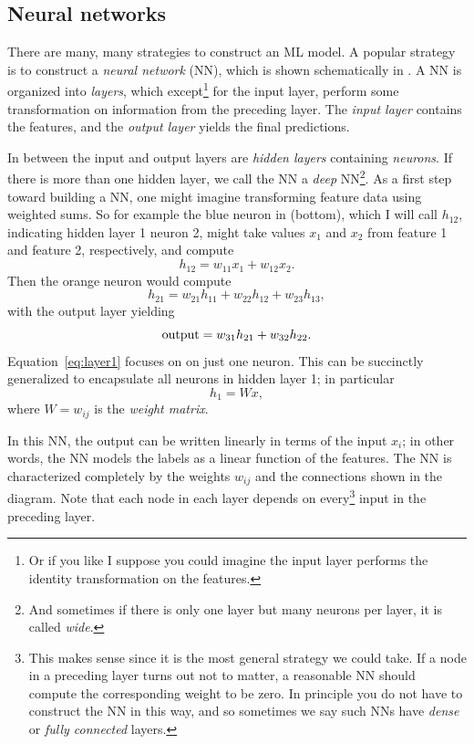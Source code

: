 \subsection{Neural networks}\label{sec:NN}

There are many, many strategies to construct an ML model.
A popular strategy is to construct a {\it neural network}
(NN), which is shown schematically in . 
A NN is organized into {\it layers}, which except\footnote{Or if you like
I suppose you could imagine the input layer performs the identity
transformation on the features.} for the input layer,
perform some transformation on information from the preceding layer. 
The {\it input layer} contains the features, and
the {\it output layer} yields the final predictions.

In between the input and output layers are 
{\it hidden layers} containing {\it neurons}.
If there is more than one hidden layer, we call the NN a {\it deep}
NN\footnote{And sometimes if there is only one
layer but many neurons per layer, it is called {\it wide}.}.
As a first step toward building a NN, one might imagine transforming
feature data using weighted sums. So for example 
the blue neuron in  (bottom), which I will
call $h_{12}$, indicating hidden layer 1 neuron 2, might take values
$x_1$ and $x_2$ from feature 1 and feature 2, respectively, and compute
\begin{equation}\label{eq:layer1}
h_{12} = w_{11}x_1+w_{12}x_2.
\end{equation}
Then the orange neuron would compute
\begin{equation}
h_{21} = w_{21}h_{11}+w_{22}h_{12}+w_{23}h_{13},
\end{equation}
with the output layer yielding
\begin{equation}
{\rm output} = w_{31}h_{21}+w_{32}h_{22}.
\end{equation}
Equation~\eqref{eq:layer1} focuses on on just one neuron. This can be succinctly
generalized to encapsulate all neurons in hidden layer 1; in particular
\begin{equation}
h_1=W x,
\end{equation} 
where $W=w_{ij}$ is the {\it weight matrix}.

In this NN, the output can be written linearly in terms of the input $x_i$;
in other words, the NN models the labels as a linear function of the features.
The NN is characterized completely by the weights $w_{ij}$ and the connections
shown in the diagram. Note that each node in each layer depends on
every\footnote{This makes sense since it is the most
general strategy we could take. If a node in a preceding layer turns out
not to matter, a reasonable NN should compute the corresponding weight to be
zero. In principle you do not have to construct the NN in this way, and
so sometimes we say such NNs have {\it dense} or {\it fully connected}
layers.} input in the preceding layer.

